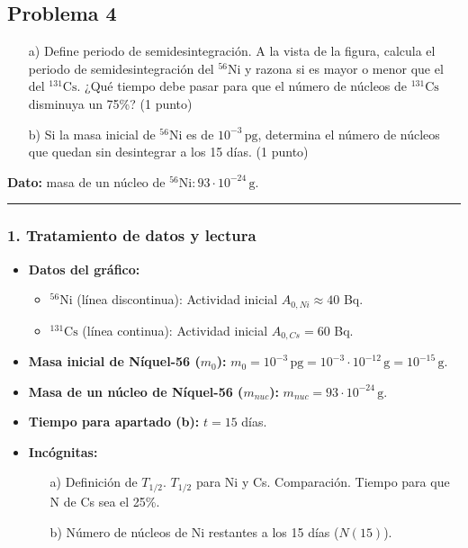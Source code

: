 \subsection{Problema 4}
\label{subsec:P4_2021_jun_ord}

\begin{cajaenunciado}
\begin{enumerate}
    \item[a)] Define periodo de semidesintegración. A la vista de la figura, calcula el periodo de semidesintegración del ${}^{56}\text{Ni}$ y razona si es mayor o menor que el del ${}^{131}\text{Cs}$. ¿Qué tiempo debe pasar para que el número de núcleos de ${}^{131}\text{Cs}$ disminuya un 75\%? (1 punto)
    \item[b)] Si la masa inicial de ${}^{56}\text{Ni}$ es de $10^{-3}\,\text{pg}$, determina el número de núcleos que quedan sin desintegrar a los 15 días. (1 punto)
\end{enumerate}
\textbf{Dato:} masa de un núcleo de ${}^{56}\text{Ni}: 93 \cdot 10^{-24}\,\text{g}$.
\end{cajaenunciado}
\hrule

\subsubsection*{1. Tratamiento de datos y lectura}
\begin{itemize}
    \item \textbf{Datos del gráfico:}
    \begin{itemize}
        \item ${}^{56}\text{Ni}$ (línea discontinua): Actividad inicial $A_{0,Ni} \approx 40$ Bq.
        \item ${}^{131}\text{Cs}$ (línea continua): Actividad inicial $A_{0,Cs} = 60$ Bq.
    \end{itemize}
    \item \textbf{Masa inicial de Níquel-56 ($m_0$):} $m_0 = 10^{-3} \, \text{pg} = 10^{-3} \cdot 10^{-12} \, \text{g} = 10^{-15} \, \text{g}$.
    \item \textbf{Masa de un núcleo de Níquel-56 ($m_{nuc}$):} $m_{nuc} = 93 \cdot 10^{-24} \, \text{g}$.
    \item \textbf{Tiempo para apartado (b):} $t = 15$ días.
    \item \textbf{Incógnitas:}
    \begin{itemize}
        \item[a)] Definición de $T_{1/2}$. $T_{1/2}$ para Ni y Cs. Comparación. Tiempo para que N de Cs sea el 25\%.
        \item[b)] Número de núcleos de Ni restantes a los 15 días ($N(15)$).
    \end{itemize}
\end{itemize}


